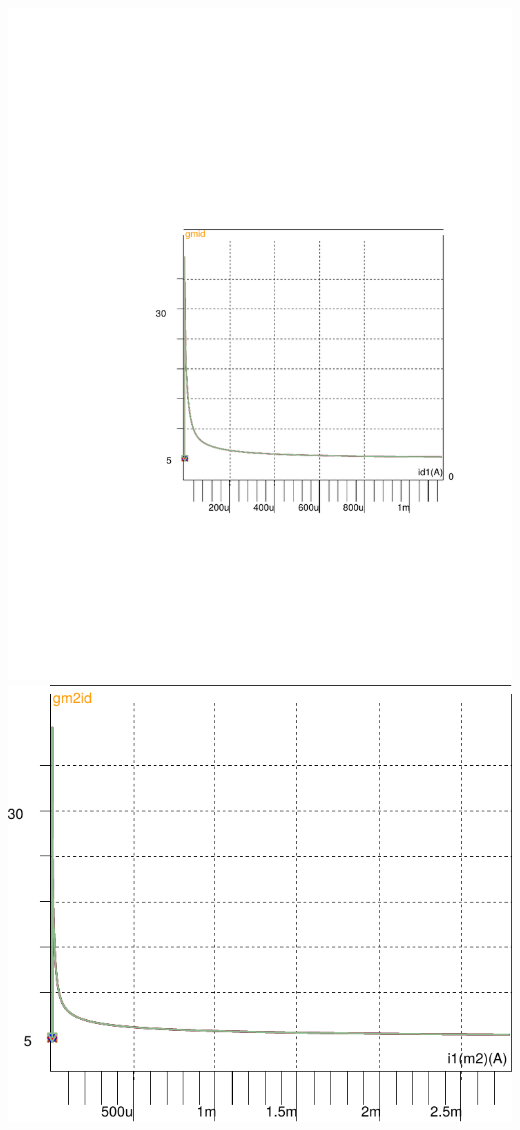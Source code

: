 \vspace{0.3cm}
\includegraphics[scale=0.6, angle=0]{images/gmid_id_m1}
\includegraphics[scale=0.6, angle=0]{images/gmid_id_m2}
